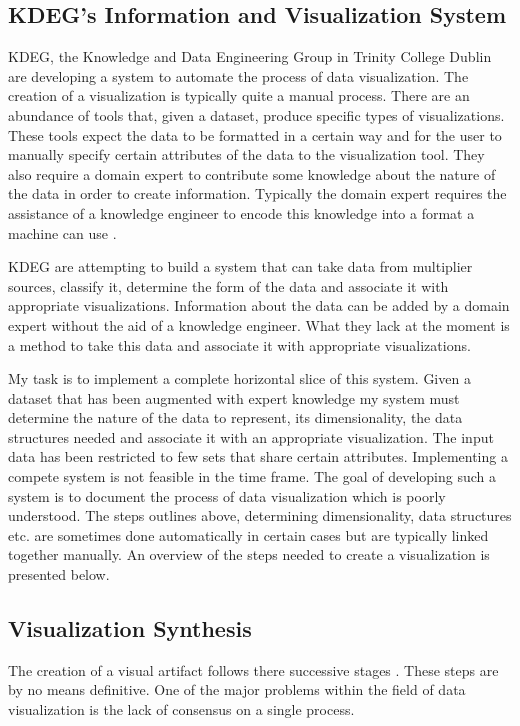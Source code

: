 \documentclass[a4paper, 10pt, titlepage, twocolumn]{article}
\begin{document}
\subsection{KDEG's Information and Visualization System}
KDEG, the Knowledge and Data Engineering Group in Trinity College Dublin are developing a system to automate the process of data visualization. The creation of a visualization is typically quite a manual process. There are an abundance of tools that, given a dataset, produce specific types of visualizations. These tools expect the data to be formatted in a certain way and for the user to manually specify certain attributes of the data to the visualization tool. They also require a domain expert to contribute some knowledge about the nature of the data in order to create information. Typically the domain expert requires the assistance of a knowledge engineer to encode this knowledge into a format a machine can use \cite{champ}.

KDEG are attempting to build a system that can take data from multiplier sources, classify it, determine the form of the data and associate it with appropriate visualizations. Information about the data can be added by a domain expert without the aid of a knowledge engineer. What they lack at the moment is a method to take this data and associate it with appropriate visualizations.

My task is to implement a complete horizontal slice of this system. Given a dataset that has been augmented with expert knowledge my system must determine the nature of the data to represent, its dimensionality, the data structures needed and associate it with an appropriate visualization. The input data has been restricted to few sets that share certain attributes. Implementing a compete system is not feasible in the time frame. The goal of developing such a system is to document the process of data visualization which is poorly understood. The steps outlines above, determining dimensionality, data structures etc. are sometimes done automatically in certain cases but are typically linked together manually. An overview of the steps needed to create a visualization is presented below.

\subsection{Visualization Synthesis}
The creation of a visual artifact follows there successive stages \cite{mazza2009introduction}. These steps are by no means definitive. One of the major problems within the field of data visualization is the lack of consensus on a single process.
\end{document}
